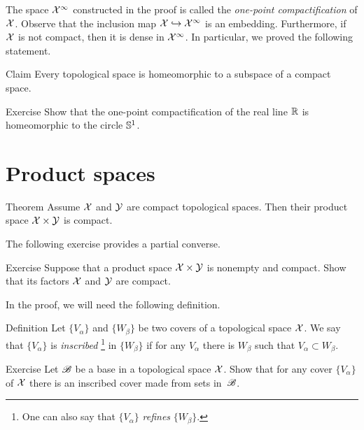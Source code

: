 The space $\mathcal{X}^\infty$ constructed in the proof is called the \emph{one-point compactification} of $\mathcal{X}$.
Observe that the inclusion map $\mathcal{X}\hookrightarrow\mathcal{X}^\infty$ is an embedding.
Furthermore, if $\mathcal{X}$ is not compact, then it is dense in $\mathcal{X}^\infty$.
In particular, we proved the following statement.

\begin{thm}{Claim}
Every topological space is homeomorphic to a subspace of a compact space.
\end{thm}


\begin{thm}{Exercise}\label{ex:one-point-comp}
Show that the one-point compactification of the real line $\mathbb{R}$ is homeomorphic to the circle $\mathbb{S}^1$.
\end{thm}

 
\section{Product spaces}

\begin{thm}{Theorem}\label{thm:compact-product}
Assume $\mathcal{X}$ and $\mathcal{Y}$ are compact topological spaces.
Then their product space $\mathcal{X}\times\mathcal{Y}$ is compact.
\end{thm}

The following exercise provides a partial converse.

\begin{thm}{Exercise}\label{ex:compact-product}
Suppose that a product space $\mathcal{X}\times\mathcal{Y}$ is nonempty and compact.
Show that its factors $\mathcal{X}$ and $\mathcal{Y}$ are compact.
\end{thm} 

In the proof, we will need the following definition.

\begin{thm}{Definition}
Let $\{V_\alpha\}$ and $\{W_\beta\}$ be two covers of a topological space $\mathcal{X}$.
We say that $\{V_\alpha\}$ is \emph{inscribed}%
\footnote{One can also say that $\{V_\alpha\}$ \emph{refines} $\{W_\beta\}$.}
in $\{W_\beta\}$ if for any $V_\alpha$ there is $W_\beta$ such that $V_\alpha\subset W_\beta$.
\end{thm}

\begin{thm}{Exercise}\label{ex:inscribed-cover-base}
Let $\mathscr{B}$ be a base in a topological space $\mathcal{X}$.
Show that for any cover $\{V_\alpha\}$ of $\mathcal{X}$ there is an inscribed cover made from sets in~$\mathscr{B}$.
\end{thm}

